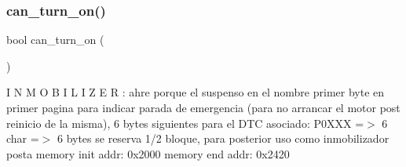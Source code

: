 \subsubsection{\texorpdfstring{can\+\_\+turn\+\_\+on()}{can\_turn\_on()}}
{\footnotesize\ttfamily bool can\+\_\+turn\+\_\+on (\begin{DoxyParamCaption}{ }\end{DoxyParamCaption})}

I N M O B I L I Z E R \+: ahre porque el suspenso en el nombre primer byte en primer pagina para indicar parada de emergencia (para no arrancar el motor post reinicio de la misma), 6 bytes siguientes para el D\+TC asociado\+: P0\+X\+XX =$>$ 6 char =$>$ 6 bytes se reserva 1/2 bloque, para posterior uso como inmobilizador posta memory init addr\+: 0x2000 memory end addr\+: 0x2420 